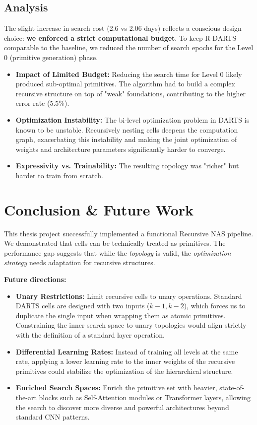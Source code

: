 \documentclass[a4paper,11pt]{article}
\begin{document}
\subsection{Analysis}
The slight increase in search cost (2.6 vs 2.06 days) reflects a conscious design choice: \textbf{we enforced a strict computational budget}. To keep R-DARTS comparable to the baseline, we reduced the number of search epochs for the Level 0 (primitive generation) phase.

\begin{itemize}
    \item \textbf{Impact of Limited Budget:} Reducing the search time for Level 0 likely produced sub-optimal primitives. The algorithm had to build a complex recursive structure on top of "weak" foundations, contributing to the higher error rate (5.5\%).
    \item \textbf{Optimization Instability:} The bi-level optimization problem in DARTS is known to be unstable. Recursively nesting cells deepens the computation graph, exacerbating this instability and making the joint optimization of weights and architecture parameters significantly harder to converge.
    \item \textbf{Expressivity vs. Trainability:} The resulting topology was "richer" but harder to train from scratch.
\end{itemize}

\clearpage
\section{Conclusion \& Future Work}
This thesis project successfully implemented a functional Recursive NAS pipeline. We demonstrated that cells can be technically treated as primitives. The performance gap suggests that while the \textit{topology} is valid, the \textit{optimization strategy} needs adaptation for recursive structures.

\textbf{Future directions:}
\begin{itemize}
    \item \textbf{Unary Restrictions:} Limit recursive cells to unary operations. Standard DARTS cells are designed with two inputs ($k-1, k-2$), which forces us to duplicate the single input when wrapping them as atomic primitives. Constraining the inner search space to unary topologies would align strictly with the definition of a standard layer operation.
    \item \textbf{Differential Learning Rates:} Instead of training all levels at the same rate, applying a lower learning rate to the inner weights of the recursive primitives could stabilize the optimization of the hierarchical structure.
    \item \textbf{Enriched Search Spaces:} Enrich the primitive set with heavier, state-of-the-art blocks such as Self-Attention modules or Transformer layers, allowing the search to discover more diverse and powerful architectures beyond standard CNN patterns.
\end{itemize}
\end{document}
